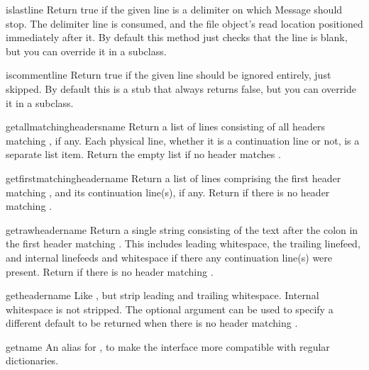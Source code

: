 \begin{methoddesc}{islast}{line}
Return true if the given line is a delimiter on which Message should
stop.  The delimiter line is consumed, and the file object's read
location positioned immediately after it.  By default this method just
checks that the line is blank, but you can override it in a subclass.
\end{methoddesc}

\begin{methoddesc}{iscomment}{line}
Return true if the given line should be ignored entirely, just skipped.
By default this is a stub that always returns false, but you can
override it in a subclass.
\end{methoddesc}

\begin{methoddesc}{getallmatchingheaders}{name}
Return a list of lines consisting of all headers matching
, if any.  Each physical line, whether it is a continuation
line or not, is a separate list item.  Return the empty list if no
header matches .
\end{methoddesc}

\begin{methoddesc}{getfirstmatchingheader}{name}
Return a list of lines comprising the first header matching
, and its continuation line(s), if any.  Return
 if there is no header matching .
\end{methoddesc}

\begin{methoddesc}{getrawheader}{name}
Return a single string consisting of the text after the colon in the
first header matching .  This includes leading whitespace,
the trailing linefeed, and internal linefeeds and whitespace if there
any continuation line(s) were present.  Return  if there is
no header matching .
\end{methoddesc}

\begin{methoddesc}{getheader}{name}
Like , but strip leading and trailing
whitespace.  Internal whitespace is not stripped.  The optional
 argument can be used to specify a different default to
be returned when there is no header matching .
\end{methoddesc}

\begin{methoddesc}{get}{name}
An alias for , to make the interface more compatible 
with regular dictionaries.
\end{methoddesc}

